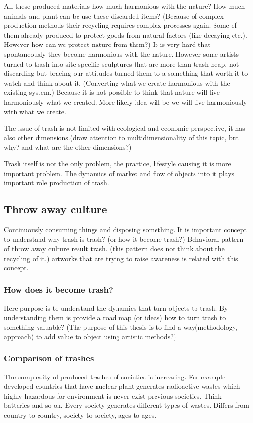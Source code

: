 \documentclass{article}
\begin{document}
All these produced materials how much harmonious with the nature? How much animals and plant can be use these discarded items? (Because of complex production methods their recycling requires complex processes again. Some of them already produced to protect goods from natural factors (like decaying etc.). However how can we protect nature from them?) It is very hard that spontaneously they become harmonious with the nature. However some artists turned to trash into site specific sculptures that are more than trash heap. not discarding but bracing our attitudes turned them to a something that worth it to watch and think about it. (Converting what we create harmonious with the existing system.) Because it is not possible to think that nature will live harmoniously what we created. More likely idea will be we will live harmoniously with what we create.

The issue of trash is not limited with ecological and economic perspective, it has also other dimensions.(draw attention to multidimensionality of this topic, but why? and what are the other dimensions?)

Trash itself is not the only problem, the practice, lifestyle causing it is more important problem. The dynamics of market and flow of objects into it plays important role production of trash.

\subsection{Throw away culture}
Continuously consuming things and disposing something. It is important concept to understand why trash is trash? (or how it become trash?) Behavioral pattern of throw away culture result trash. (this pattern does not think about the recycling of it.) artworks that are trying to raise awareness is related with this concept. 

\subsubsection{How does it become trash?}
Here purpose is to understand the dynamics that turn objects to trash. By understanding them is provide a road map (or ideas) how to turn trash to something valuable? (The purpose of this thesis is to find a way(methodology, approach) to add value to object using artistic methods?)

\subsubsection{Comparison of trashes}
The complexity of produced trashes of societies is increasing. For example developed countries that have nuclear plant generates radioactive wastes which highly hazardous for environment is never exist previous societies. Think batteries and so on. Every society generates different types of wastes. Differs from country to country, society to society, ages to ages.
\end{document}
